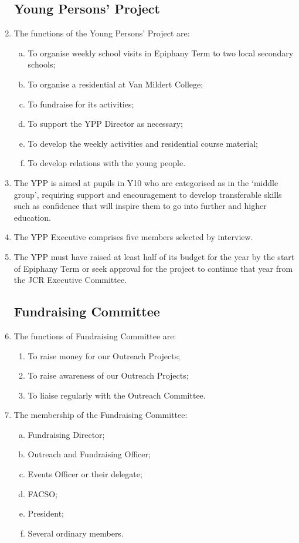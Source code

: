 \documentclass[12pt]{article}
\begin{document}
\begin{enumerate}
    \subsection{Young Persons’ Project}
    \item The functions of the Young Persons’ Project are:
    \begin{enumerate}[(a)]
        \item To organise weekly school visits in Epiphany Term to two local secondary schools;
        \item To organise a residential at Van Mildert College;
        \item To fundraise for its activities;
        \item To support the YPP Director as necessary;
        \item To develop the weekly activities and residential course material;
        \item To develop relations with the young people.
    \end{enumerate}
    \item The YPP is aimed at pupils in Y10 who are categorised as in the ‘middle group’, requiring support and encouragement to develop transferable skills such as confidence that will inspire them to go into further and higher education.
    \item The YPP Executive comprises five members selected by interview.
    \item The YPP must have raised at least half of its budget for the year by the start of Epiphany Term or seek approval for the project to continue that year from the JCR Executive Committee.
    \subsection{Fundraising Committee}
    \item The functions of Fundraising Committee are:
    \begin{enumerate}
        \item To raise money for our Outreach Projects;
        \item To raise awareness of our Outreach Projects;
        \item To liaise regularly with the Outreach Committee.
    \end{enumerate}
    \item The membership of the Fundraising Committee:
    \begin{enumerate}[(a)]
        \item Fundraising Director;
        \item Outreach and Fundraising Officer;
        \item Events Officer or their delegate;
        \item FACSO;
        \item President;
        \item Several ordinary members.
    \end{enumerate}


\end{enumerate}
\end{document}
